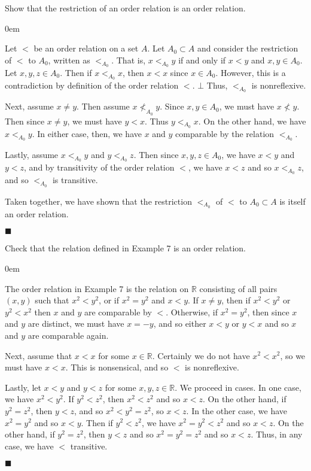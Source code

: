 \documentclass[12pt]{article}
\renewcommand{\qed}{\hfill$\blacksquare$}
\renewenvironment{proof}{\begin{addmargin}[1em]{0em}\begin{newproof}}{\end{newproof}\end{addmargin}\qed}
\newenvironment{problem}[2][Exercise]{\begin{trivlist}
\item[\hskip \labelsep {\bfseries #1}\hskip \labelsep {\bfseries #2.}]}{\end{trivlist}}
\begin{document}
\begin{problem}{1.3.7}
Show that the restriction of an order relation is an order relation.
\end{problem}
\begin{proof}
Let $<$ be an order relation on a set $A$. Let $A_0 \subset A$ and consider the restriction of $<$ to $A_0$, written as $<_{A_0}$. That is, $x<_{A_0} y$ if and only if $x<y$ and $x,y \in A_0$. Let $x,y,z \in A_0$. Then if $x<_{A_0} x$, then $x < x$ since $x\in A_0$. However, this is a contradiction by definition of the order relation $<$. $\bot$ Thus, $<_{A_0}$ is nonreflexive.

Next, assume $x \neq y$. Then assume $x \not<_{A_0} y$. Since $x,y \in A_0$, we must have $x \not< y$. Then since $x\neq y$, we must have $y < x$. Thus $y <_{A_0} x$. On the other hand, we have $x <_{A_0} y$. In either case, then, we have $x$ and $y$ comparable by the relation $<_{A_0}$.

Lastly, assume $x<_{A_0}y$ and $y <_{A_0} z$. Then since $x,y,z \in A_0$, we have $x<y$ and $y<z$, and by transitivity of the order relation $<$, we have $x<z$ and so $x <_{A_0} z$, and so $<_{A_0}$ is transitive.

Taken together, we have shown that the restriction $<_{A_0}$ of $<$ to $A_0 \subset A$ is itself an order relation.
\end{proof}


\begin{problem}{1.3.8}
Check that the relation defined in Example 7 is an order relation.
\end{problem}
\begin{proof}
The order relation in Example 7 is the relation on $\mathbb{R}$ consisting of all pairs $\left(x,y\right)$ such that $x^2 < y^2$, or if $x^2=y^2$ and $x<y$. If $x \neq y$, then if $x^2 < y^2$ or $y^2 < x^2$ then $x$ and $y$ are comparable by $<$. Otherwise, if $x^2 = y^2$, then since $x$ and $y$ are distinct, we must have $x = -y$, and so either $x < y$ or $y< x$ and so $x$ and $y$ are comparable again.

Next, assume that $x < x$ for some $x \in \mathbb{R}$. Certainly we do not have $x^2 < x^2$, so we must have $x<x$. This is nonsensical, and so $<$ is nonreflexive.

Lastly, let $x<y$ and $y<z$ for some $x,y,z \in \mathbb{R}$. We proceed in cases. In one case, we have $x^2 < y^2$. If $y^2 < z^2$, then $x^2 < z^2$ and so $x<z$. On the other hand, if $y^2 = z^2$, then $y<z$, and so $x^2 < y^2 = z^2$, so $x < z$. In the other case, we have $x^2 = y^2$ and so $x<y$. Then if $y^2 < z^2$, we have $x^2 = y^2 < z^2$ and so $x < z$. On the other hand, if $y^2=z^2$, then $y<z$ and so $x^2 = y^2 =z^2$ and so $x < z$. Thus, in any case, we have $<$ transitive.
\end{proof}
\end{document}
